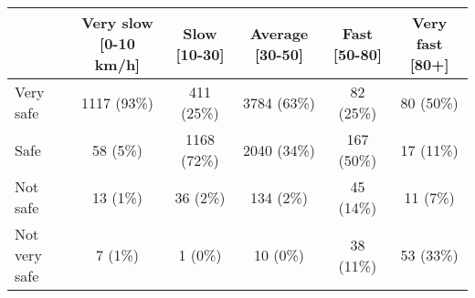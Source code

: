 \begin{tabular}{l c|c|c|c|c} \hline  & Very slow [0-10 km/h] & Slow [10-30] & Average [30-50] & Fast [50-80] & Very fast [80+] \\ 
\hline Very safe & 1117 (93\%) & 411 (25\%) & 3784 (63\%) & 82 (25\%) & 80 (50\%) \\ 
  Safe & 58 (5\%) & 1168 (72\%) & 2040 (34\%) & 167 (50\%) & 17 (11\%) \\ 
  Not safe & 13 (1\%) & 36 (2\%) & 134 (2\%) & 45 (14\%) & 11 (7\%) \\ 
  Not very safe & 7 (1\%) & 1 (0\%) & 10 (0\%) & 38 (11\%) & 53 (33\%) \\ 
 \hline \end{tabular}